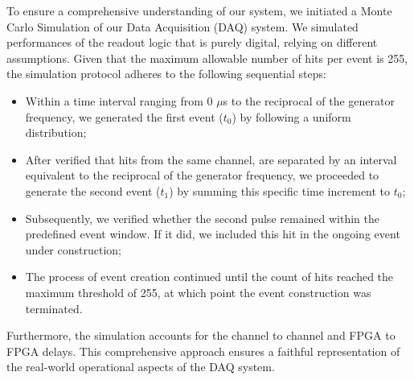 To ensure a comprehensive understanding of our system, we initiated a Monte Carlo Simulation of our Data Acquisition (DAQ) system. 
We simulated performances of the readout logic that is purely digital, relying on different assumptions.
Given that the maximum allowable number of hits per event is 255, the simulation protocol adheres to the following sequential steps:
\begin{itemize}
  \item Within a time interval ranging from 0 $\mu$s to the reciprocal of the generator frequency, we generated the first event ($t_0$) by following a uniform distribution;
    \item After verified that hits from the same channel, are separated by an interval equivalent to the reciprocal of the generator frequency, we proceeded to 
      generate the second event ($t_1$) by summing this specific time increment to $t_0$;
      \item Subsequently, we verified whether the second pulse remained within the predefined event window. If it did, we included this hit in the ongoing event under construction;
      \item The process of event creation continued until the count of hits reached the maximum threshold of 255, at which point the event construction was terminated.
\end{itemize}
Furthermore, the simulation accounts for the channel to channel and FPGA to FPGA delays. 
This comprehensive approach ensures a faithful representation of the real-world operational aspects of the DAQ system.



